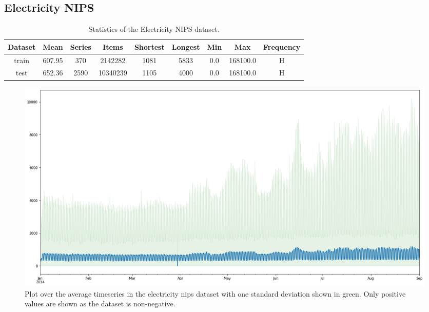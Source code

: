 \clearpage
\subsection{Electricity NIPS}
\begin{table}[htb]
    \begin{tabular}{||c | c c c c c c c c ||}
        \hline
        Dataset & Mean   & Series & Items    & Shortest & Longest & Min & Max      & Frequency \\ [0.5ex]
        \hline\hline
        train   & 607.95 & 370    & 2142282  & 1081     & 5833    & 0.0 & 168100.0 & H         \\
        \hline
        test    & 652.36 & 2590   & 10340239 & 1105     & 4000    & 0.0 & 168100.0 & H         \\
        \hline
    \end{tabular}
    \caption{Statistics of the Electricity NIPS dataset.}
\end{table}

\begin{figure}[htb]
    \centering
    \includegraphics[width=\linewidth]{./img/electricity_nips_plot.png}
    \caption{Plot over the average timeseries in the electricity nips dataset with one standard deviation shown in green. Only positive values are shown as the dataset is non-negative.}
    \label{fig:electricity_nips_plot}
    \endminipage\hfill
\end{figure}

